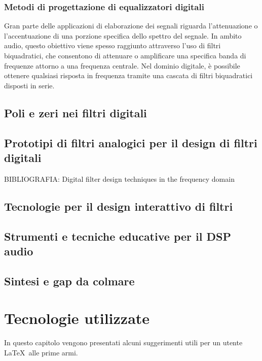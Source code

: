 \documentclass[12pt]{report}
\begin{document}
\subsection{Metodi di progettazione di equalizzatori digitali}
Gran parte delle applicazioni di elaborazione dei segnali riguarda l'attenuazione o l'accentuazione di una porzione specifica dello spettro del segnale. In ambito audio, questo obiettivo viene spesso raggiunto attraverso l’uso di filtri biquadratici, che consentono di attenuare o amplificare una specifica banda di frequenze attorno a una frequenza centrale. Nel dominio digitale, è possibile ottenere qualsiasi risposta in frequenza tramite una cascata di filtri biquadratici disposti in serie.



\section{Poli e zeri nei filtri digitali}

\section{Prototipi di filtri analogici per il design di filtri digitali}
BIBLIOGRAFIA: Digital filter design techniques in the frequency domain

\section{Tecnologie per il design interattivo di filtri}

\section{Strumenti e tecniche educative per il DSP audio}

\section{Sintesi e gap da colmare}


% 
% 

\chapter{Tecnologie utilizzate}
\label{cap3}

In questo capitolo vengono presentati alcuni suggerimenti utili per un utente \LaTeX\ alle prime armi.
\end{document}
